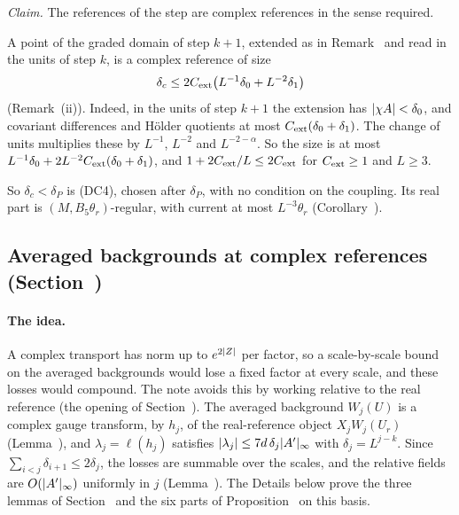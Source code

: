 \begin{detail}\label{xa:d-ext-use}
\emph{Claim.} The references of the step are complex references in the sense required.

A point of the graded domain of step $k+1$, extended as in Remark~ and read in the units of step $k$, is a complex reference of size
\[
\delta_c\le2C_{\rm ext}\big(L^{-1}\delta_0+L^{-2}\delta_1\big)
\]
(Remark~(ii)). Indeed, in the units of step $k+1$ the extension has $\lvert\chi A\rvert<\delta_0$, and covariant differences and H\"older quotients at most $C_{\rm ext}(\delta_0+\delta_1)$. The change of units multiplies these by $L^{-1}$, $L^{-2}$ and $L^{-2-\alpha}$. So the size is at most $L^{-1}\delta_0+2L^{-2}C_{\rm ext}(\delta_0+\delta_1)$, and $1+2C_{\rm ext}/L\le2C_{\rm ext}$ for $C_{\rm ext}\ge1$ and $L\ge3$.

So $\delta_c<\delta_P$ is (DC4), chosen after $\delta_P$, with no condition on the coupling. Its real part is $(M,B_5\theta_r)$-regular, with current at most $L^{-3}\theta_r$ (Corollary~).
\end{detail}

\subsection{Averaged backgrounds at complex references (Section~\texorpdfstring{}{46.1})}\label{xa:sec-AB}

\paragraph{The idea.} A complex transport has norm up to $e^{2\lvert Z\rvert}$ per factor, so a scale-by-scale bound on the averaged backgrounds would lose a fixed factor at every scale, and these losses would compound. The note avoids this by working relative to the real reference (the opening of Section~). The averaged background $W_j(U)$ is a complex gauge transform, by $h_j$, of the real-reference object $X_jW_j(U_r)$ (Lemma~), and $\lambda_j=\ell(h_j)$ satisfies $\lvert\lambda_j\rvert\le7d\,\delta_j\lvert A'\rvert_\infty$ with $\delta_j=L^{j-k}$. Since $\sum_{i<j}\delta_{i+1}\le2\delta_j$, the losses are summable over the scales, and the relative fields are $O(\lvert A'\rvert_\infty)$ uniformly in $j$ (Lemma~). The Details below prove the three lemmas of Section~ and the six parts of Proposition~ on this basis.

